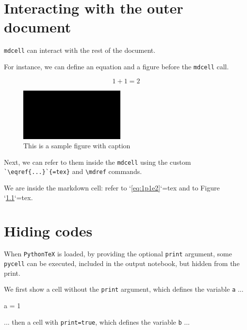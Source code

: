 \documentclass[oneside]{book}
\begin{document}
\chapter{Interacting with the outer document}

\texttt{mdcell} can interact with the rest of the document.

For instance, we can define an equation and a figure before the \texttt{mdcell} call.

\begin{equation}
1 + 1 = 2
\label{eq:1p1e2}
\end{equation}

\begin{figure}
\centering
\includegraphics[width=0.5\linewidth]{images/fail_image_verification.png}
\caption{This is a sample figure with caption}
\label{fig:black}
\end{figure}

Next, we can refer to them inside the \texttt{mdcell} using the custom \verb|`\eqref{...}`{=tex}| and \verb|\mdref| commands.

\begin{mdcell}
We are inside the markdown cell: refer to `\eqref{eq:1p1e2}`{=tex} and to Figure `\ref{fig:black}`{=tex}.
\end{mdcell}

\chapter{Hiding codes}

When \texttt{PythonTeX} is loaded, by providing the optional \texttt{print} argument, some \texttt{pycell} can be executed, included in the output notebook, but hidden from the print.

We first show a cell without the \texttt{print} argument, which defines the variable \texttt{a} ...

\begin{pycell}
a = 1
\end{pycell}

... then a cell with \texttt{print=true}, which defines the variable \texttt{b} ...
\end{document}
